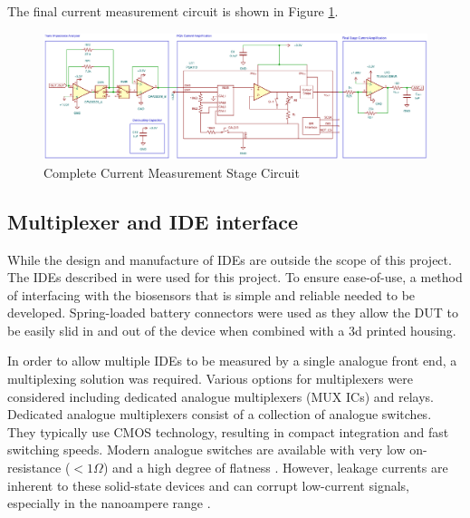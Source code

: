 The final current measurement circuit is shown in Figure \ref{fig:imeas_stage_circuit}.
\begin{figure}[H]
    \centering
    \includegraphics[width=\textwidth]{IMeasSchem.png}
    \caption{Complete Current Measurement Stage Circuit}
    \label{fig:imeas_stage_circuit}
\end{figure}

\subsection{Multiplexer and IDE interface}
While the design and manufacture of \acp{IDE} are outside the scope of this project. The \acp{IDE} described in \cite{ebrahimDevelopmentBiosensorEarly2023} were used for this project. To ensure ease-of-use, a method of interfacing with the biosensors that is simple and reliable needed to be developed. Spring-loaded battery connectors were used as they allow the DUT to be easily slid in and out of the device when combined with a 3d printed housing.

In order to allow multiple \acp{IDE} to be measured by a single analogue front end, a multiplexing solution was required. Various options for multiplexers were considered including dedicated analogue multiplexers (MUX ICs) and relays. Dedicated analogue multiplexers consist of a collection of analogue switches. They typically use CMOS technology, resulting in compact integration and fast switching speeds. Modern analogue switches are available with very low on-resistance ($<1\Omega$) and a high degree of flatness \cite{SelectingRightCMOS}. However, leakage currents are inherent to these solid-state devices and can corrupt low-current signals, especially in the nanoampere range \cite{SelectingRightCMOS}. 


